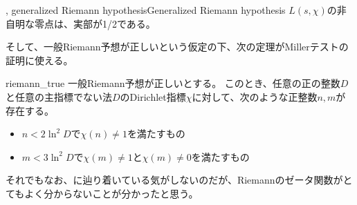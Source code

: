 \begin{Conj}{, generalized Riemann hypothesis}{Generalized Riemann hypothesis}
$L(s,\chi)$の非自明な零点は、実部が1/2である。
\end{Conj}

そして、一般Riemann予想が正しいという仮定の下、次の定理がMillerテストの証明に使える。

\begin{Theo}{}{riemann_true}
一般Riemann予想が正しいとする。
このとき、任意の正の整数$D$と任意の主指標でない法$D$のDirichlet指標$\chi$に対して、次のような正整数$n,m$が存在する。
\begin{itemize}
\item $n<2\ln^2D$で$\chi(n)\neq1$を満たすもの
\item $m<3\ln^2D$で$\chi(m)\neq1$と$\chi(m)\neq0$を満たすもの
\end{itemize}
\end{Theo}

それでもなお、に辿り着いている気がしないのだが、Riemannのゼータ関数がとてもよく分からないことが分かったと思う。

